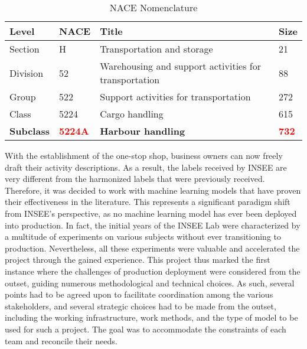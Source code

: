 \begin{table}[htbp]
    \centering
    \begin{tabular}{llll}
    \textbf{Level} & \textbf{NACE} & \textbf{Title} & \textbf{Size} \\ \hline
    Section & H & Transportation and storage & 21 \\ \hline
    Division & 52 & Warehousing and support activities for transportation & 88 \\ \hline
    Group & 522 & Support activities for transportation & 272 \\ \hline
    Class & 5224 & Cargo handling & 615 \\ \hline
    \textbf{Subclass} & \textbf{\textcolor{red}{5224A}} & \textbf{Harbour handling} & \textbf{\textcolor{red}{732}} \\ 
    \end{tabular}
    \caption{NACE Nomenclature}
    \label{tab:nace-nomenclature}
    \end{table}


With the establishment of the one-stop shop, business owners can now freely draft their activity descriptions. As a result, the labels received by INSEE are very different from the harmonized labels that were previously received. Therefore, it was decided to work with machine learning models that have proven their effectiveness in the literature. This represents a significant paradigm shift from INSEE's perspective, as no machine learning model has ever been deployed into production. In fact, the initial years of the INSEE Lab were characterized by a multitude of experiments on various subjects without ever transitioning to production. Nevertheless, all these experiments were valuable and accelerated the project through the gained experience. This project thus marked the first instance where the challenges of production deployment were considered from the outset, guiding numerous methodological and technical choices. As such, several points had to be agreed upon to facilitate coordination among the various stakeholders, and several strategic choices had to be made from the outset, including the working infrastructure, work methods, and the type of model to be used for such a project. The goal was to accommodate the constraints of each team and reconcile their needs.

